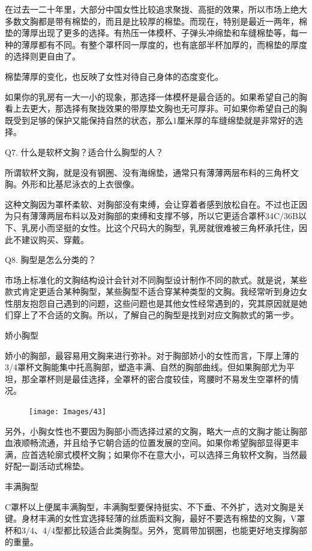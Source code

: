 \documentclass[12pt,UTF8]{ctexbook}
\begin{document}
在过去一二十年里，大部分中国女性比较追求聚拢、高挺的效果，所以市场上绝大多数文胸都是带有棉垫的，而且是比较厚的棉垫。而现在，特别是最近一两年，棉垫的薄厚出现了更多的选择。有热压一体模杯、子弹头冲绵垫和车缝棉垫等，每一种的薄厚都有不同。有整个罩杯同一厚度的，也有底部半杯加厚的，而棉垫的厚度的选择则更自由了。

棉垫薄厚的变化，也反映了女性对待自己身体的态度变化。

如果你的乳房有一大一小的现象，那选择一体模杯是最合适的。如果希望自己的胸看上去更大，那选择有聚拢效果的带厚垫文胸也无可厚非。可如果你希望自己的胸既受到足够的保护又能保持自然的状态，那么1厘米厚的车缝绵垫就是非常好的选择。

Q7. 什么是软杯文胸？适合什么胸型的人？

所谓软杯文胸，就是没有钢圈、没有海绵垫，通常只有薄薄两层布料的三角杯文胸。外形和比基尼泳衣的上衣很像。

这种文胸因为罩杯柔软、对胸部没有束缚，会让穿着者感到放松自在。不过也正因为只有薄薄两层布料以及对胸部的束缚和支撑不够，所以它更适合罩杯34C/36B以下、乳房小而坚挺的女性。比这个尺码大的胸型，乳房就很难被三角杯承托住，因此不建议购买、穿戴。

Q8. 胸型是怎么分类的？

市场上标准化的文胸结构设计会针对不同胸型设计制作不同的款式。就是说，某些款式肯定更适合某种胸型，某些胸型不适合穿某种类型的文胸。我经常听到身边女性朋友抱怨自己遇到的问题，这些问题也是其他女性经常遇到的，究其原因就是她们穿上了不合适的文胸。所以，了解自己的胸型是找到对应文胸款式的第一步。

娇小胸型

娇小的胸部，最容易用文胸来进行弥补。对于胸部娇小的女性而言，下厚上薄的3/4罩杯文胸能集中托高胸部，塑造丰满、自然的胸部曲线。但如果胸部尤为平坦，那全罩杯则是最佳选择，全罩杯的密合度较佳，弯腰时不易发生空罩杯的情况。

\begin{figure}[htbp]
	\centering
	\texttt{[image: Images/43]}
	\caption{}
	\label{fig:1}
\end{figure}

另外，小胸女性也不要因为胸部小而选择过紧的文胸，略大一点的文胸才能让胸部血液顺畅流通，并且给予它朝合适的位置发展的空间。如果你希望胸部显得更丰满，应首选轮廓式模杯文胸；如果你不在意大小，可以选择三角软杯文胸，当然最好配一副活动式棉垫。

丰满胸型

C罩杯以上便属丰满胸型，丰满胸型要保持挺实、不下垂、不外扩，选对文胸是关键。身材丰满的女性宜选择轻薄的丝质面料文胸，最好不要选有棉垫的文胸，V罩杯和3/4、4/4型都比较适合此类胸型。另外，宽肩带加钢圈，也能更好地支撑胸部的重量。
\end{document}
